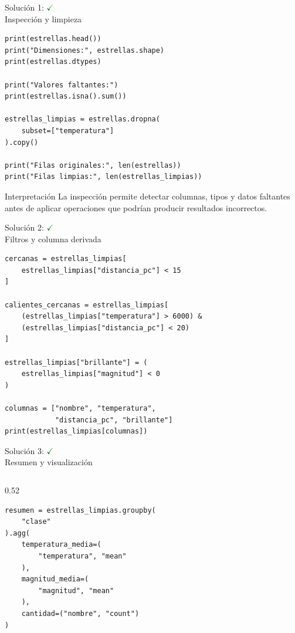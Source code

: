 \documentclass[10pt]{beamer}
\begin{document}
\begin{solutionblock}
\begin{frame}[fragile]{Solución 1: \hfill \textcolor{green}{$\checkmark$} \\ Inspección y limpieza}
\begin{verbatim}
print(estrellas.head())
print("Dimensiones:", estrellas.shape)
print(estrellas.dtypes)

print("Valores faltantes:")
print(estrellas.isna().sum())

estrellas_limpias = estrellas.dropna(
    subset=["temperatura"]
).copy()

print("Filas originales:", len(estrellas))
print("Filas limpias:", len(estrellas_limpias))
\end{verbatim}

  \begin{block}{Interpretación}
    La inspección permite detectar columnas, tipos y datos faltantes antes de aplicar operaciones que podrían producir resultados incorrectos.
  \end{block}
\end{frame}

\begin{frame}[fragile]{Solución 2: \hfill \textcolor{green}{$\checkmark$} \\ Filtros y columna derivada}
\begin{verbatim}
cercanas = estrellas_limpias[
    estrellas_limpias["distancia_pc"] < 15
]

calientes_cercanas = estrellas_limpias[
    (estrellas_limpias["temperatura"] > 6000) &
    (estrellas_limpias["distancia_pc"] < 20)
]

estrellas_limpias["brillante"] = (
    estrellas_limpias["magnitud"] < 0
)

columnas = ["nombre", "temperatura",
            "distancia_pc", "brillante"]
print(estrellas_limpias[columnas])
\end{verbatim}
\end{frame}

\begin{frame}[fragile]{Solución 3: \hfill \textcolor{green}{$\checkmark$} \\ Resumen y visualización}
\begin{columns}
\begin{column}{0.52\textwidth}
\begin{verbatim}
resumen = estrellas_limpias.groupby(
    "clase"
).agg(
    temperatura_media=(
        "temperatura", "mean"
    ),
    magnitud_media=(
        "magnitud", "mean"
    ),
    cantidad=("nombre", "count")
)


\end{verbatim}
\end{column}
\end{columns}
\end{frame}
\end{solutionblock}
\end{document}
